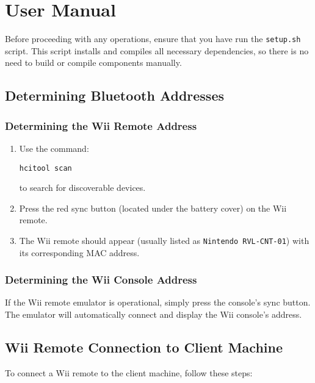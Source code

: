 \chapter{User Manual}
\label{appendix:user-manual}

Before proceeding with any operations, ensure that you have run the \texttt{setup.sh} script. This script installs and compiles all necessary dependencies, so there is no need to build or compile components manually.

\section{Determining Bluetooth Addresses}

\subsection{Determining the Wii Remote Address}
\label{subsection:wii-remote-address}

\begin{enumerate}
	\item Use the command:
	      \begin{verbatim}
hcitool scan
    \end{verbatim}
	      to search for discoverable devices.
	\item Press the red sync button (located under the battery cover) on the Wii remote.
	\item The Wii remote should appear (usually listed as \texttt{Nintendo RVL-CNT-01}) with its corresponding MAC address.
\end{enumerate}

\subsection{Determining the Wii Console Address}
\label{subsection:wii-console-address}

If the Wii remote emulator is operational, simply press the console's sync button. The emulator will automatically connect and display the Wii console's address.

\section{Wii Remote Connection to Client Machine}

To connect a Wii remote to the client machine, follow these steps:

